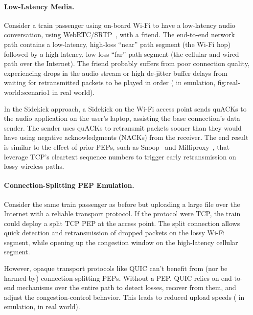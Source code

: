 \paragraph{Low-Latency Media.}

Consider a train passenger using on-board Wi-Fi to have a low-latency audio
conversation, using WebRTC/SRTP~\cite{rfc8834webrtc}, with a friend. The
end-to-end network path contains a low-latency, high-loss ``near'' path
segment (the Wi-Fi hop) followed by a high-latency, low-loss ``far'' path
segment (the cellular and wired path over the Internet). The friend probably
suffers from poor connection quality, experiencing drops in the audio stream or
high de-jitter buffer delays from waiting for retransmitted packets to be
played in order ( in emulation, \Cref
{fig:real-world:scenario1} in real world).

In the Sidekick approach, a Sidekick on the Wi-Fi access point sends quACKs to the audio
application on the user's laptop, assisting the base connection's data sender.
The sender uses quACKs to retransmit packets sooner than they would have using
negative acknowledgments (NACKs) from the receiver. The end result is similar
to the effect of prior PEPs, such as Snoop~\cite{balakrishnan1995snoop} and
Milliproxy~\cite{polese2017milliproxy}, that leverage TCP's cleartext sequence
numbers to trigger early retransmission on lossy wireless paths.

\paragraph{Connection-Splitting PEP Emulation.}

Consider the same train passenger as before but uploading a large file over the
Internet with a reliable transport protocol. If the protocol were TCP, the
train could deploy a split TCP PEP at the access point. The split connection
allows quick detection and retransmission of dropped packets on the lossy Wi-Fi
segment, while opening up the congestion window on the high-latency cellular
segment.

However, opaque transport protocols like QUIC can't benefit from (nor be harmed
by) connection-splitting PEPs. Without a PEP, QUIC relies on end-to-end
mechanisms over the entire path to detect losses, recover from them, and adjust
the congestion-control behavior. This leads to reduced upload speeds
( in emulation,  in real world).

